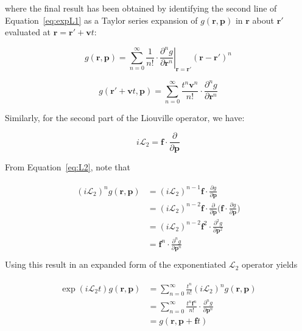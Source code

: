 \documentclass[paper=a4, fontsize=11pt]{scrartcl} %
\numberwithin{equation}{section} %
\numberwithin{figure}{section} %
\numberwithin{table}{section} %
\newcommand{\LTwo}{\mathcal{L}_2}
\begin{document}
where the final result has been obtained by identifying the second line of Equation~\ref{eq:expL1} as a Taylor series expansion of $g(\mathbf{r}, \mathbf{p})$ in $\mathbf{r}$ about $\mathbf{r'}$ evaluated at $\mathbf{r} = \mathbf{r'} + \mathbf{v} t$:

\begin{equation}
    g(\mathbf{r}, \mathbf{p}) = \sum_{n=0}^\infty \frac{1}{n!} \cdot \left. \frac{\partial^n g}{\partial \mathbf{r}^n} \right|_{\mathbf{r} = \mathbf{r'}} (\mathbf{r} - \mathbf{r'})^n
\end{equation}

\begin{equation}
    g(\mathbf{r'} + \mathbf{v} t, \mathbf{p}) = \sum_{n=0}^{\infty}\frac{t^n \mathbf{v}^n}{n!} \cdot \frac{\partial^n g}{\partial \mathbf{r}^n}
\end{equation}




Similarly, for the second part of the Liouville operator, we have:

\begin{equation} \label{eq:L2}
    i \LTwo = \mathbf{f} \cdot \frac{\partial}{\partial \mathbf{p}}
\end{equation}

From Equation~\ref{eq:L2}, note that

\begin{align} \label{eq:factorL2}
\begin{split}
    (i \LTwo)^n g(\mathbf{r}, \mathbf{p}) &= (i \LTwo)^{n-1} \mathbf{f} \cdot \frac{\partial g}{\partial \mathbf{p}} \\
                                       &= (i \LTwo)^{n-2} \mathbf{f} \cdot \frac{\partial}{\partial \mathbf{p}} \bigg( \mathbf{f} \cdot \frac{\partial g}{\partial \mathbf{p}}\bigg)\\
                                       &= (i \LTwo)^{n-2} \mathbf{f}^2 \cdot \frac{\partial^2 g}{\partial \mathbf{p}^2}\\
                                       &= \mathbf{f}^n \cdot \frac{\partial^n g}{\partial \mathbf{p}^n}\\
\end{split}
\end{align}
Using this result in an expanded form of the exponentiated $\LTwo$ operator yields

\begin{align} \label{eq:expL2}
\begin{split}
        \exp{(i \LTwo t)} g(\mathbf{r}, \mathbf{p}) &= \sum_{n=0}^{\infty}\frac{t^n}{n!} (i \LTwo)^n g(\mathbf{r}, \mathbf{p}) \\
                                                                            &= \sum_{n=0}^{\infty}\frac{t^n \mathbf{f}^n}{n!} \cdot \frac{\partial^n g}{\partial \mathbf{p}^n} \\
                                                                            &= g(\mathbf{r}, \mathbf{p} + \mathbf{f}t)
\end{split}
\end{align}
\end{document}
